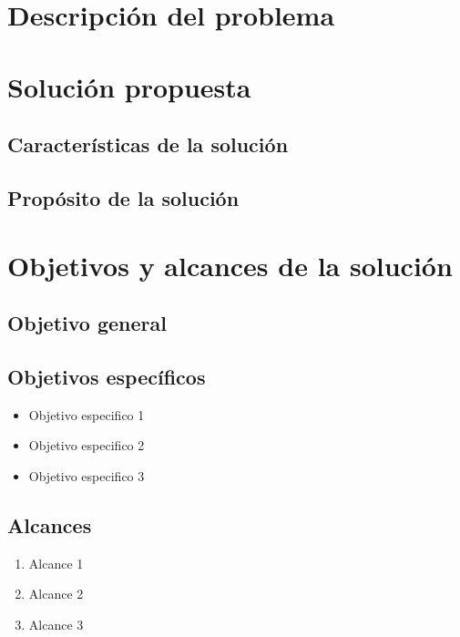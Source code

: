 \section{Descripción del problema}
\label{sec:descripcion-problema}

\section{Solución propuesta}
\label{sec:solucion-propuesta}

\subsection{Características de la solución}
\label{subsec:caracteristicas-solucion}

\subsection{Propósito de la solución}
\label{subsec:proposito-solucion}

\section{Objetivos y alcances de la solución}
\label{sec:objetivos}

\subsection{Objetivo general}
\label{subsec:objetivo-generla}

\subsection{Objetivos específicos}
\label{subsec:objetivo-especificos}
\begin{itemize}
	\item Objetivo especifico 1
	\item Objetivo especifico 2
	\item Objetivo especifico 3
\end{itemize}

\subsection{Alcances}
\label{subsec:alcances}
\begin{enumerate}
	\item Alcance 1
	\item Alcance 2
	\item Alcance 3
\end{enumerate}

